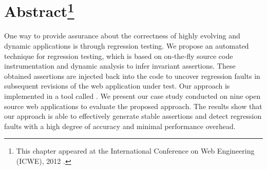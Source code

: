 \section*{Abstract\footnote{This chapter appeared at the International Conference on Web Engineering (ICWE), 2012 \cite{mirshokraie:icwe12}.}}
One way to provide assurance about the correctness of highly evolving and dynamic applications is through regression testing. We propose an automated technique for \javascript regression testing, which is based on on-the-fly \javascript source code instrumentation and dynamic analysis to infer invariant assertions. These obtained assertions are injected back into the \javascript code to uncover regression faults in subsequent revisions of the web application under test.
Our approach is implemented in a tool called \jsart. We present our case study conducted on nine open source web applications to evaluate the proposed approach. The results show that our approach is able to effectively generate stable assertions and detect \javascript regression faults with a high degree of accuracy and minimal performance overhead.


